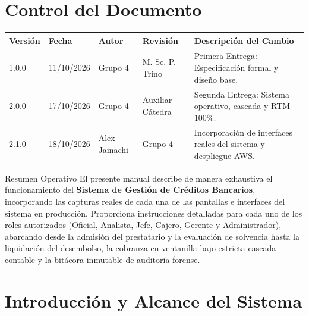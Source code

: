 \documentclass[11pt,letterpaper]{article}
\begin{document}
\section*{Control del Documento}
\begin{table}[h!]
    \centering
    \begin{tabularx}{\textwidth}{llllX}
        \toprule
        \textbf{Versión} & \textbf{Fecha} & \textbf{Autor} & \textbf{Revisión} & \textbf{Descripción del Cambio} \\
        \midrule
        1.0.0 & 11/10/2026 & Grupo 4 & M. Sc. P. Trino & Primera Entrega: Especificación formal y diseño base. \\
        2.0.0 & 17/10/2026 & Grupo 4 & Auxiliar Cátedra & Segunda Entrega: Sistema operativo, cascada y RTM 100\%. \\
        2.1.0 & 18/10/2026 & Alex Jamachi & Grupo 4 & Incorporación de interfaces reales del sistema y despliegue AWS. \\
        \bottomrule
    \end{tabularx}
\end{table}

\vspace{0.5cm}
\begin{bankBox}{Resumen Operativo}
El presente manual describe de manera exhaustiva el funcionamiento del \textbf{Sistema de Gestión de Créditos Bancarios}, incorporando las capturas reales de cada una de las pantallas e interfaces del sistema en producción. Proporciona instrucciones detalladas para cada uno de los roles autorizados (Oficial, Analista, Jefe, Cajero, Gerente y Administrador), abarcando desde la admisión del prestatario y la evaluación de solvencia hasta la liquidación del desembolso, la cobranza en ventanilla bajo estricta cascada contable y la bitácora inmutable de auditoría forense.
\end{bankBox}

\newpage
\tableofcontents
\newpage

\section{Introducción y Alcance del Sistema}
\end{document}

